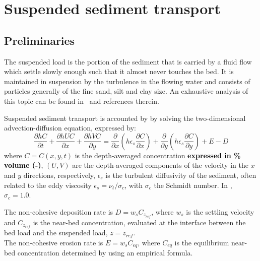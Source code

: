 \chapter[Suspended sediment transport]{Suspended sediment transport}\label{sec:SuspendedSedimentTransport}

\section{Preliminaries}
The suspended load is the portion of the sediment that is carried by a fluid flow which settle slowly enough such that it almost never touches the bed. It is maintained in suspension by the turbulence in the flowing water and consists of particles generally of the fine sand, silt and clay size. An exhaustive analysis of this topic can be found in~\cite{GarciaBook2006} and references therein.

Suspended sediment transport is accounted by \sisyphe{} by solving the two-dimensional advection-diffusion equation, expressed by:
\begin{equation}\label{eq:2DADE}
\frac{\partial hC}{\partial t} + \frac{\partial hUC}{\partial x} + \frac{\partial hVC}{\partial y} =
\frac{\partial}{\partial x}\left(h\epsilon_s\frac{\partial C}{\partial x}\right) +
\frac{\partial}{\partial y}\left(h\epsilon_s\frac{\partial C}{\partial y}\right) + E-D
\end{equation}
where $C=C(x,y,t)$ is the depth-averaged concentration \textcolor{black}{\bf expressed in \% volume (-)}, $(U,V)$ are the depth-averaged components of the velocity in the $x$ and $y$ directions, respectively, $\epsilon_s$ is the turbulent diffusivity of the sediment, often related to the eddy viscosity $\epsilon_s=\nu_t/\sigma_c$, with $\sigma_c$ the Schmidt number. In \sisyphe{}, $\sigma_c=1.0$.

The non-cohesive deposition rate is $D = w_s C_{z_{ref}}$, where $w_s$ is the settling velocity and $C_{z_{ref}}$ is the near-bed concentration, evaluated at the interface between the bed load
and the suspended load, $z=z_{ref}$.\\

The non-cohesive erosion rate is $E = w_s C_{eq}$, where $C_{eq}$ is the equilibrium near-bed concentration determined by using an empirical formula.

